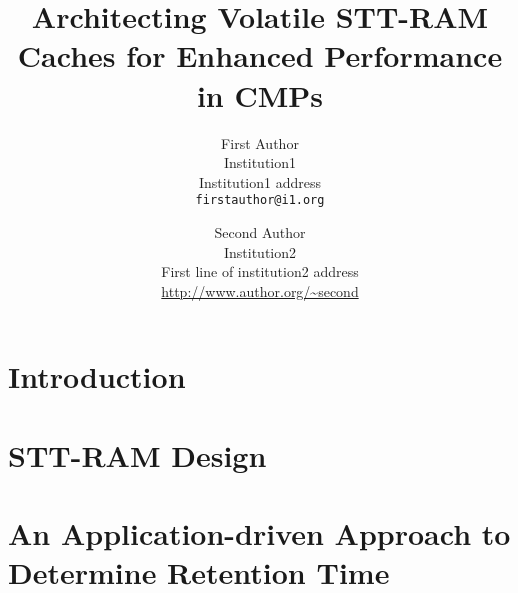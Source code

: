 \documentclass[12pt,letterpaper]{article}
\begin{document}
\title{Architecting Volatile STT-RAM Caches for Enhanced Performance in
CMPs}

\author{First Author\\
Institution1\\
Institution1 address\\
{\tt\small firstauthor@i1.org}
\and
Second Author\\
Institution2\\
First line of institution2 address\\
{\small\url{http://www.author.org/~second}}
}

\maketitle

\begin{abstract}

\end{abstract}
\section{Introduction} \label{sec:intro}

\section{STT-RAM Design} \label{sec:design}

\vspace{-2mm}
\section{An Application-driven Approach to Determine Retention Time} \label{sec:motivation}

\end{document}
